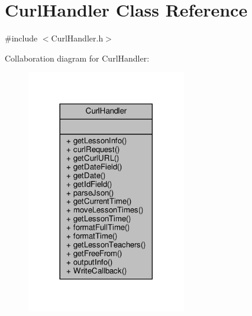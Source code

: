 \hypertarget{classCurlHandler}{}\section{Curl\+Handler Class Reference}
\label{classCurlHandler}


{\ttfamily \#include $<$Curl\+Handler.\+h$>$}



Collaboration diagram for Curl\+Handler\+:\nopagebreak
\begin{figure}[H]
\begin{center}
\leavevmode
\includegraphics[width=197pt]{classCurlHandler__coll__graph}
\end{center}
\end{figure}
